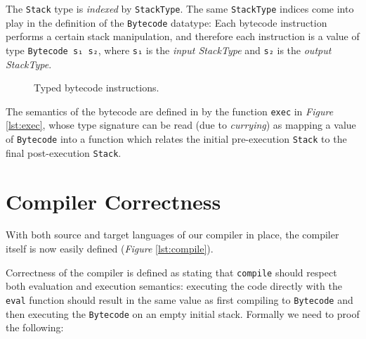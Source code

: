 \documentclass[a4paper]{article}
\newcommand{\fref}[1]{\emph{Figure} \ref{lst:#1}}
\begin{document}
        The \texttt{Stack} type is \emph{indexed} by \texttt{StackType}.
        The same \texttt{StackType} indices come into play in the definition of the \texttt{Bytecode} datatype:
        Each bytecode instruction performs a certain stack manipulation,
        and therefore each instruction is a value of type \texttt{Bytecode s₁ s₂},
        where \texttt{s₁} is the \emph{input StackType} and \texttt{s₂} is the \emph{output StackType}.

        \begin{figure}[h!]
            \caption{Typed bytecode instructions.
                \label{lst:bytecode}
            }
        \end{figure}

        The semantics of the bytecode are defined in by the function \texttt{exec} in \fref{exec}, whose type 
        signature can be read (due to \emph{currying}) as mapping a value of \texttt{Bytecode}
        into a function which relates the initial pre-execution \texttt{Stack} to the final post-execution \texttt{Stack}.


        
    \section{Compiler Correctness}
    \label{sec:correctness}
        With both source and target languages of our compiler in place, the compiler itself is now easily defined (\fref{compile}).


        Correctness of the compiler is defined as stating that \texttt{compile} should respect both evaluation and execution semantics: executing
        the code directly with the \texttt{eval} function should result in the same value as first compiling to \texttt{Bytecode} and
        then executing the \texttt{Bytecode} on an empty initial stack. Formally we need to proof the following:
        
\end{document}
